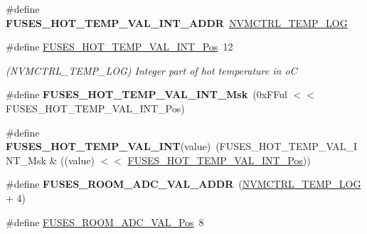 \begin{DoxyCompactItemize}
\item 
\hypertarget{group__fuses__api_gaf68e4fd5545d5e73c972066eb048fc1f}{}\#define {\bfseries F\+U\+S\+E\+S\+\_\+\+H\+O\+T\+\_\+\+T\+E\+M\+P\+\_\+\+V\+A\+L\+\_\+\+I\+N\+T\+\_\+\+A\+D\+D\+R}~\hyperlink{group___s_a_m_l21_j18_a__base_gae900d443ec6d7cf1c90d21b6662fa447}{N\+V\+M\+C\+T\+R\+L\+\_\+\+T\+E\+M\+P\+\_\+\+L\+O\+G}\label{group__fuses__api_gaf68e4fd5545d5e73c972066eb048fc1f}

\item 
\hypertarget{group__fuses__api_ga3c7e8d3e46d03e0b6424b34762295643}{}\#define \hyperlink{group__fuses__api_ga3c7e8d3e46d03e0b6424b34762295643}{F\+U\+S\+E\+S\+\_\+\+H\+O\+T\+\_\+\+T\+E\+M\+P\+\_\+\+V\+A\+L\+\_\+\+I\+N\+T\+\_\+\+Pos}~12\label{group__fuses__api_ga3c7e8d3e46d03e0b6424b34762295643}

\begin{DoxyCompactList}\small\item\em (N\+V\+M\+C\+T\+R\+L\+\_\+\+T\+E\+M\+P\+\_\+\+L\+O\+G) Integer part of hot temperature in o\+C \end{DoxyCompactList}\item 
\hypertarget{group__fuses__api_gaff5f713bd806967ce109e596af3db8c9}{}\#define {\bfseries F\+U\+S\+E\+S\+\_\+\+H\+O\+T\+\_\+\+T\+E\+M\+P\+\_\+\+V\+A\+L\+\_\+\+I\+N\+T\+\_\+\+Msk}~(0x\+F\+Ful $<$$<$ F\+U\+S\+E\+S\+\_\+\+H\+O\+T\+\_\+\+T\+E\+M\+P\+\_\+\+V\+A\+L\+\_\+\+I\+N\+T\+\_\+\+Pos)\label{group__fuses__api_gaff5f713bd806967ce109e596af3db8c9}

\item 
\hypertarget{group__fuses__api_gab8c34e55e4455db7b5c6bf0d6a0fddff}{}\#define {\bfseries F\+U\+S\+E\+S\+\_\+\+H\+O\+T\+\_\+\+T\+E\+M\+P\+\_\+\+V\+A\+L\+\_\+\+I\+N\+T}(value)~(F\+U\+S\+E\+S\+\_\+\+H\+O\+T\+\_\+\+T\+E\+M\+P\+\_\+\+V\+A\+L\+\_\+\+I\+N\+T\+\_\+\+Msk \& ((value) $<$$<$ \hyperlink{group__fuses__api_ga3c7e8d3e46d03e0b6424b34762295643}{F\+U\+S\+E\+S\+\_\+\+H\+O\+T\+\_\+\+T\+E\+M\+P\+\_\+\+V\+A\+L\+\_\+\+I\+N\+T\+\_\+\+Pos}))\label{group__fuses__api_gab8c34e55e4455db7b5c6bf0d6a0fddff}

\item 
\hypertarget{group__fuses__api_ga124754058b563fa0227d2ba9c258bd58}{}\#define {\bfseries F\+U\+S\+E\+S\+\_\+\+R\+O\+O\+M\+\_\+\+A\+D\+C\+\_\+\+V\+A\+L\+\_\+\+A\+D\+D\+R}~(\hyperlink{group___s_a_m_l21_j18_a__base_gae900d443ec6d7cf1c90d21b6662fa447}{N\+V\+M\+C\+T\+R\+L\+\_\+\+T\+E\+M\+P\+\_\+\+L\+O\+G} + 4)\label{group__fuses__api_ga124754058b563fa0227d2ba9c258bd58}

\item 
\hypertarget{group__fuses__api_ga91faceb6e2669f510f7a325fb1fd5748}{}\#define \hyperlink{group__fuses__api_ga91faceb6e2669f510f7a325fb1fd5748}{F\+U\+S\+E\+S\+\_\+\+R\+O\+O\+M\+\_\+\+A\+D\+C\+\_\+\+V\+A\+L\+\_\+\+Pos}~8\label{group__fuses__api_ga91faceb6e2669f510f7a325fb1fd5748}


\end{DoxyCompactItemize}
